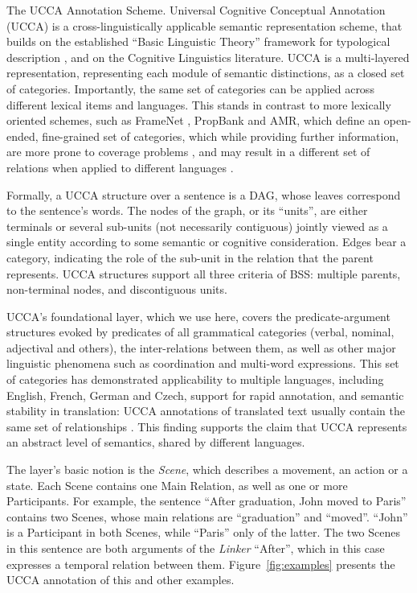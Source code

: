 \documentclass[11pt]{article}
\makeatletter
\newcommand{\figref}[1]{Figure~\ref{#1}}
\renewcommand{\paragraph}{
  \@startsection{paragraph}{4}
  {\z@}{.5ex \@plus .5ex \@minus .2ex}{-1em}
  {\normalfont\normalsize\bfseries}
}
\makeatother
\begin{document}
\paragraph{The UCCA Annotation Scheme.}
Universal Cognitive Conceptual Annotation (UCCA)
is a cross-linguistically applicable semantic representation scheme,
that builds on the established ``Basic Linguistic Theory'' framework for typological description
\cite{Dixon:10b,Dixon:10a,Dixon:12}, and on the Cognitive Linguistics literature.
UCCA is a multi-layered representation, representing each module of semantic distinctions,
as a closed set of categories.
Importantly, the same set of categories can be applied across different lexical items and languages.
This stands in contrast to more lexically oriented schemes, such as FrameNet \cite{Baker:98},
PropBank \cite{Palmer:05} and AMR, which define an open-ended, fine-grained set of categories,
which while providing further information, are more prone to coverage problems \cite{Palmer:10},
and may result in a different set of relations when applied to different languages \cite{Xue2014not}.

Formally, a UCCA structure over a sentence is a DAG, whose leaves correspond to the sentence's words.
The nodes of the graph, or its ``units'', are either terminals or several
sub-units (not necessarily contiguous) jointly viewed as a
single entity according to some semantic or cognitive consideration.
Edges bear a category, indicating the role of the sub-unit in the relation that the parent represents.
UCCA structures support all three criteria of BSS: multiple parents, non-terminal nodes, and discontiguous units.

UCCA's foundational layer, which we use here, covers the predicate-argument
structures evoked by predicates of all grammatical categories
(verbal, nominal, adjectival and others), the inter-relations between them,
as well as other major linguistic phenomena such as coordination and multi-word expressions.
This set of categories has demonstrated applicability to multiple languages, including
English, French, German and Czech, support for rapid annotation, and semantic stability in translation:
UCCA annotations of translated text usually contain the same set of relationships
\cite{sulem2015conceptual}. This finding supports the claim that UCCA represents an abstract
level of semantics, shared by different languages.

The layer's basic notion is the {\it Scene}, which describes a movement, an action or a state.
Each Scene contains one Main Relation, as well as one or more Participants.
For example, the sentence ``After graduation, John moved to Paris'' contains two Scenes,
whose main relations are ``graduation'' and ``moved''. ``John'' is a Participant in both Scenes,
while ``Paris'' only of the latter.
The two Scenes in this sentence are both arguments of the \textit{Linker} ``After'',
which in this case expresses a temporal relation between them.
\figref{fig:examples} presents the UCCA annotation of this and other examples.
\end{document}
